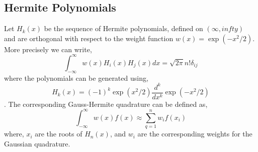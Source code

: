 \documentclass{article}
\begin{document}
\subsection{Hermite Polynomials}
Let $H_k (x)$ be the sequence of Hermite polynomials, defined on $(\infty,infty)$ and are orthogonal with respect to the weight function $w(x) = \exp(-x^2/2)$. More precisely we can write, 
\begin{equation}
    \int_{-\infty}^{\infty} w(x) H_i(x) H_j(x) dx = \sqrt{2\pi} n! \delta_{ij}
\end{equation}where the polynomials can be generated using, 
\begin{equation}
    H_k(x) = (-1)^k \exp(x^2/2) \frac{d^k}{dx^k} \exp(-x^2/2)
\end{equation}. The corresponding Gauss-Hermite quadrature can be defined as, 
\begin{equation}
    \int_{-\infty}^{\infty} w(x) f(x) \approx \sum_{q=1}^{n} w_i f(x_i)
\end{equation} where, $x_i$ are the roots of $H_n(x)$, and $w_i$ are the corresponding weights for the Gaussian quadrature. 






\end{document}

